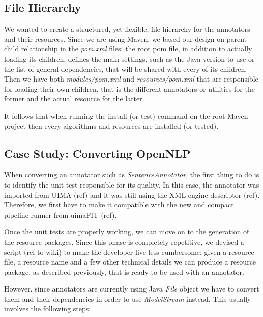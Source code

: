 \documentclass{article}
\newcommand{\id}[1]{\mbox{\textit{#1}}}
\newcommand{\TODO}[1]{\textcolor{YellowOrange}{(#1)}} %
\begin{document}
\subsection{File Hierarchy}

We wanted to create a structured, yet flexible, file hierarchy for the annotators and their resources. Since we are using Maven, we based our design on parent-child relationship in the \id{pom.xml} files: the root pom file, in addition to actually loading its children, defines the main settings, such as the Java version to use or the list of general dependencies, that will be shared with every of its children. Then we have both \id{modules/pom.xml} and \id{resources/pom.xml} that are responsible for loading their own children, that is the different annotators or utilities for the former and the actual resource for the latter.

It follows that when running the install (or test) command on the root Maven project then every algorithms and resources are installed (or tested).

\subsection{Case Study: Converting OpenNLP}

When converting an annotator such as \id{SentenceAnnotator}, the first thing to do is to identify the unit test responsible for its quality. In this case, the annotator was imported from UIMA \TODO{ref} and it was still using the XML engine descriptor \TODO{ref}. Therefore, we first have to make it compatible with the new and compact pipeline runner from uimaFIT \TODO{ref}.

Once the unit tests are properly working, we can move on to the generation of the resource packages. Since this phase is completely repetitive, we devised a script \TODO{ref to wiki} to make the developer live less cumbersome: given a resource file, a resource name and a few other technical details we can produce a resource package, as described previously, that is ready to be used with an annotator.

However, since annotators are currently using Java \id{File} object we have to convert them and their dependencies in order to use \id{ModelStream} instead. This usually involves the following steps:
\end{document}
